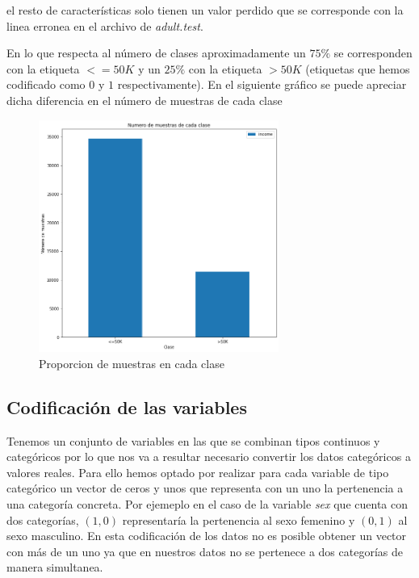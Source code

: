 \documentclass[11pt]{article}
\begin{document}
el resto de características solo tienen un valor perdido que se corresponde 
con la linea erronea en el archivo de \textit{adult.test}.

En lo que respecta al número de clases aproximadamente un $75\%$ se corresponden 
con la etiqueta $<=50K$ y un $25\%$ con la etiqueta $>50K$ (etiquetas que hemos
codificado como $0$ y $1$ respectivamente). En el siguiente gráfico se puede apreciar 
dicha diferencia en el número de muestras de cada clase 

\begin{figure}[h!]
    \centering
    \includegraphics[width=0.7\textwidth]{images/proportion}
    \caption{Proporcion de muestras en cada clase}
\end{figure}


\subsection{Codificación de las variables}

Tenemos un conjunto de variables en las que se combinan tipos continuos y
categóricos por lo que nos va a resultar necesario convertir los datos
categóricos a valores reales. Para ello hemos optado por realizar para cada
variable de tipo categórico un vector de ceros y unos que representa con un uno
la pertenencia a una categoría concreta. Por ejemeplo en el caso de la variable
\textit{sex} que cuenta con dos categorías, $(1,0)$ representaría la pertenencia
al sexo femenino y $(0,1)$ al sexo masculino. En esta codificación de los datos
no es posible obtener un vector con más de un uno ya que en nuestros datos no se
pertenece a dos categorías de manera simultanea.
\end{document}
